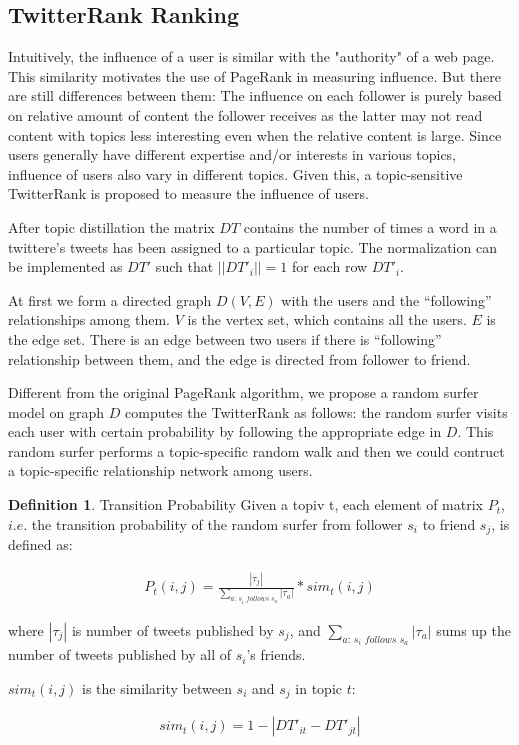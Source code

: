 \documentclass[conference]{IEEEtran}
\theoremstyle{definition}
\newtheorem{definition}{Definition}
\begin{document}
\subsection{TwitterRank Ranking}
Intuitively, the influence of a \textup{user} is similar with the "authority" of a web page. This similarity motivates the use of PageRank in measuring influence. But there are still differences between them: The influence on each follower is purely based on relative amount of content the follower receives as the latter may not read content with topics less interesting even when the relative content is large. Since users generally have different expertise and/or interests in various topics, influence of users also vary in different topics. Given this, a topic-sensitive TwitterRank is proposed to measure the influence of users. 

After topic distillation the matrix $DT$ contains the number of times a word in a \textup{twittere's tweets} has been assigned to a particular topic. The normalization can be implemented as $DT'$ such that $||DT'_i|| = 1$ for each row $DT'_i$. 

At first we form a directed graph $D(V, E)$ with the \textup{users} and the “following” relationships among them. $V$ is the vertex set, which contains all the \textup{users}. $E$ is the edge set. There is an edge between two \textup{users} if there is “following” relationship between them, and the edge is directed from \textup{follower} to \textup{friend}.

Different from the original PageRank algorithm, we propose a \textup{random surfer model} on graph $D$ computes the TwitterRank as follows: the random surfer visits each \textup{user} with certain probability by following the appropriate edge in $D$. This random surfer performs a topic-specific random walk and then we could contruct a topic-specific relationship network among \textup{users}. 

\theoremstyle{definition}
\begin{definition}{Transition Probability}
	Given a topiv t, each element of matrix $P_t$, $i.e.$ the transition probability of the random surfer from follower $s_i$ to friend $s_j$, is defined as:
	
	\begin{align}
	P_t(i,j) = \frac{|\tau_j|}{\sum_{a: \, s_i \,\, follows \,\, s_a}|\tau_a|} * sim_t(i,j)
	\end{align}
	
	where $|\tau_j|$ is number of tweets published by $s_j$, and $\sum_{a: \, s_i \,\, follows \,\, s_a}|\tau_a|$ sums up the number of tweets published by all of $s_i$'s friends. 
	
	$sim_t(i,j)$ is the similarity between $s_i$ and $s_j$ in topic $t$:
	
	\begin{align}
	sim_t(i,j) = 1 - |DT'_{it} - DT'_{jt}|
	\end{align}
\end{definition}
\end{document}
